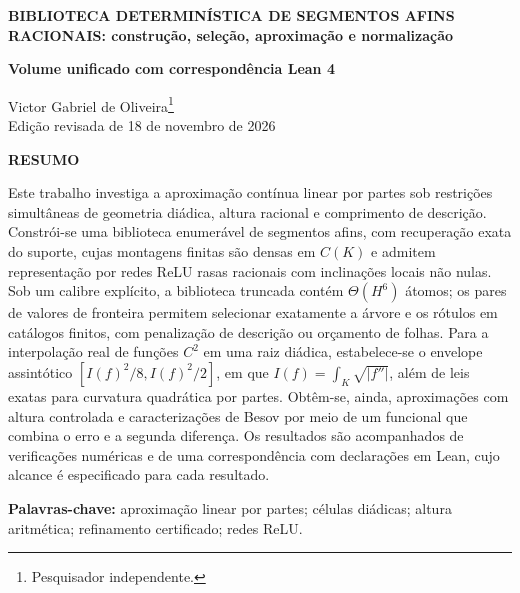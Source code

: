 \documentclass[12pt,a4paper]{article}
\theoremstyle{preciso}
\theoremstyle{definition}
\theoremstyle{preciso}
\theoremstyle{preciso}
\theoremstyle{preciso}
\theoremstyle{preciso}
\theoremstyle{definition}
\theoremstyle{preciso}
\theoremstyle{definition}
\theoremstyle{preciso}
\theoremstyle{preciso}
\theoremstyle{definition}
\begin{document}
\thispagestyle{empty}
\begin{center}
{\bfseries\fontsize{14}{17}\selectfont BIBLIOTECA DETERMINÍSTICA DE SEGMENTOS AFINS RACIONAIS: construção, seleção, aproximação e normalização\par}
\vspace{8pt}
{\bfseries Volume unificado com correspondência Lean 4\par}
\end{center}
\vspace{6pt}
\begin{flushright}
\singlespacing
Victor Gabriel de Oliveira\footnote{Pesquisador independente.}\\
Edição revisada de 18 de novembro de 2026
\end{flushright}
\vspace{12pt}
\begin{singlespace}
\begin{center}\bfseries RESUMO\end{center}
\noindent Este trabalho investiga a aproximação contínua linear por partes sob restrições simultâneas de geometria diádica, altura racional e comprimento de descrição. Constrói-se uma biblioteca enumerável de segmentos afins, com recuperação exata do suporte, cujas montagens finitas são densas em $C(K)$ e admitem representação por redes ReLU rasas racionais com inclinações locais não nulas. Sob um calibre explícito, a biblioteca truncada contém $\Theta(H^6)$ átomos; os pares de valores de fronteira permitem selecionar exatamente a árvore e os rótulos em catálogos finitos, com penalização de descrição ou orçamento de folhas. Para a interpolação real de funções $C^2$ em uma raiz diádica, estabelece-se o envelope assintótico $[I(f)^2/8,I(f)^2/2]$, em que $I(f)=\int_K\sqrt{|f''|}$, além de leis exatas para curvatura quadrática por partes. Obtêm-se, ainda, aproximações com altura controlada e caracterizações de Besov por meio de um funcional que combina o erro e a segunda diferença. Os resultados são acompanhados de verificações numéricas e de uma correspondência com declarações em Lean, cujo alcance é especificado para cada resultado.

\medskip\noindent\textbf{Palavras-chave:} aproximação linear por partes; células diádicas; altura aritmética; refinamento certificado; redes ReLU.


\end{singlespace}
\end{document}
